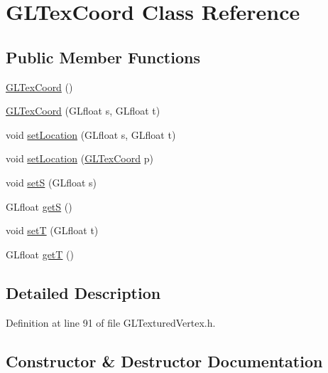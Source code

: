 \hypertarget{class_g_l_tex_coord}{}\section{G\+L\+Tex\+Coord Class Reference}
\label{class_g_l_tex_coord}
\subsection*{Public Member Functions}
\begin{DoxyCompactItemize}
\item 
\hyperlink{class_g_l_tex_coord_ac91e39d08f1cab9c4d6d9e8630892035}{G\+L\+Tex\+Coord} ()
\item 
\hyperlink{class_g_l_tex_coord_a838018e649a392249c823aa21b822c50}{G\+L\+Tex\+Coord} (G\+Lfloat s, G\+Lfloat t)
\item 
void \hyperlink{class_g_l_tex_coord_a7fc21b6e9c475f08c84344af9e563c81}{set\+Location} (G\+Lfloat s, G\+Lfloat t)
\item 
void \hyperlink{class_g_l_tex_coord_aec023deb7d7179d42efe4d4b56446e71}{set\+Location} (\hyperlink{class_g_l_tex_coord}{G\+L\+Tex\+Coord} p)
\item 
void \hyperlink{class_g_l_tex_coord_a9f1d6f2f75f450779dce7467c15847c8}{set\+S} (G\+Lfloat s)
\item 
G\+Lfloat \hyperlink{class_g_l_tex_coord_a65f4ca4de11c47c92ae6800367dd7e83}{get\+S} ()
\item 
void \hyperlink{class_g_l_tex_coord_a5c8f7b4360628aa2d51bf46bc91e1e86}{set\+T} (G\+Lfloat t)
\item 
G\+Lfloat \hyperlink{class_g_l_tex_coord_a41b2a4ce2966317a8bbb15fd31732fe5}{get\+T} ()
\end{DoxyCompactItemize}


\subsection{Detailed Description}


Definition at line 91 of file G\+L\+Textured\+Vertex.\+h.



\subsection{Constructor \& Destructor Documentation}
\hypertarget{class_g_l_tex_coord_ac91e39d08f1cab9c4d6d9e8630892035}{}
